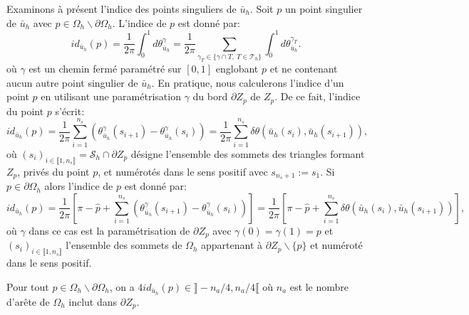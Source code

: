 Examinons à présent l'indice des points singuliers de $\bar{u}_h$. Soit $p$ un point singulier de $\bar{u}_h$ avec $p\in\Omega_h\backslash\partial\Omega_h$. L'indice de $p$ est donné par:
$$
id_{\bar{u}_h}(p)=\frac{1}{2\pi}\int_0^1 d\theta^\gamma_{\bar{u}_h}=\frac{1}{2\pi}\sum_{\gamma_T\in\{\gamma\cap T,~T\in\mathcal{T}_h\}}\int_0^1 d\theta^{\gamma_T}_{\bar{u}_h}.
$$
où $\gamma$ est un chemin fermé paramétré sur $[0, 1]$ englobant $p$ et ne contenant aucun autre point singulier de $\bar{u}_h$. En pratique, nous calculerons l'indice d'un point $p$ en utilisant une paramétrisation $\gamma$ du bord $\partial Z_p$ de $Z_p$. De ce fait, l'indice du point $p$ s'écrit:
\begin{equation}
    \label{eqn:ind_int}
    id_{\bar{u}_h}(p)=\displaystyle\frac{1}{2\pi}\displaystyle\sum_{i=1}^{n_s}\left(\theta^\gamma_{\bar{u}_h}(s_{i+1})-\theta^\gamma_{\bar{u}_h}(s_i)\right)=\displaystyle\frac{1}{2\pi}\sum_{i=1}^{n_s}\delta\theta(\bar{u}_h(s_i),\bar{u}_h(s_{i+1})),
\end{equation}
où $(s_i)_{i\in\llbracket 1, n_s\rrbracket}=\mathcal{S}_h\cap\partial Z_p$ désigne l'ensemble des sommets des triangles formant $Z_p$, privés du point $p$, et numérotés dans le sens positif avec $s_{n_s+1}:=s_1$.
Si $p\in\partial\Omega_h$ alors l'indice de $p$ est donné par:
\begin{equation}
    \label{eqn:ind_bord}
    id_{\bar{u}_h}(p)=\displaystyle\frac{1}{2\pi}\left[\pi-\widehat{p}+\displaystyle\sum_{i=1}^{n_s}\left(\theta^\gamma_{\bar{u}_h}(s_{i+1})-\theta^\gamma_{\bar{u}_h}(s_i)\right)\right]=\displaystyle\frac{1}{2\pi}\left[\pi-\widehat{p}+\displaystyle\sum_{i=1}^{n_s}\delta\theta(\bar{u}_h(s_i),\bar{u}_h(s_{i+1}))\right],
\end{equation}
où $\gamma$ dans ce cas est la paramétrisation de $\partial Z_p$ avec $\gamma(0)=\gamma(1)=p$ et $(s_i)_{i\in\llbracket 1, n_s\rrbracket}$ l'ensemble des sommets de $\Omega_h$ appartenant à $\partial Z_p\backslash\{p\}$ et numéroté dans le sens positif.

\begin{proposition}
\label{prop:ind_sing_zone}
Pour tout $p\in\Omega_h\backslash\partial\Omega_h$, on a $4id_{\bar{u}_h}(p)\in\rrbracket -n_a/4, n_a/4\llbracket$ où $n_a$ est le nombre d'arête de $\Omega_h$ inclut dans $\partial Z_p$.
\end{proposition}

